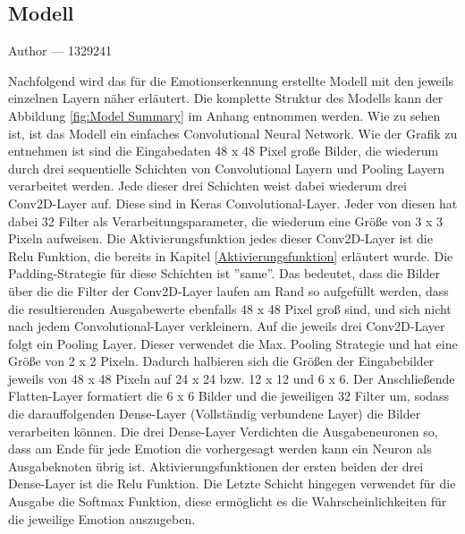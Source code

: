 \documentclass[12pt, a4paper]{report}
\makeatletter
\newcommand{\sectionauthor}[1]{%
  {\parindent0pt\vspace*{-5pt}%
  \large{Author --- }
  \linespread{1.1}\large\scshape#1%
  \par\nobreak\vspace*{35pt} }
  \@afterheading%
}
\makeatother
\begin{document}
\subsection{Modell}
\sectionauthor{1329241}
Nachfolgend wird das für die Emotionserkennung erstellte Modell mit den jeweils einzelnen Layern näher erläutert. Die komplette Struktur des Modells kann der Abbildung \ref{fig:Model Summary} im Anhang entnommen werden.
Wie zu sehen ist, ist das Modell ein einfaches Convolutional Neural Network. 
Wie der Grafik zu entnehmen ist sind die Eingabedaten 48 x 48 Pixel große Bilder, die wiederum durch drei sequentielle Schichten von Convolutional Layern und Pooling Layern verarbeitet werden. Jede dieser drei Schichten weist dabei wiederum drei Conv2D-Layer auf. Diese sind in Keras Convolutional-Layer. Jeder von diesen hat dabei 32 Filter als Verarbeitungsparameter, die wiederum eine Größe von 3 x 3 Pixeln aufweisen. Die Aktivierungsfunktion jedes dieser Conv2D-Layer ist die Relu Funktion, die bereits in Kapitel \ref{Aktivierungsfunktion} erläutert wurde. Die Padding-Strategie für diese Schichten ist ''same''. Das bedeutet, dass die Bilder über die die Filter der Conv2D-Layer laufen am Rand so aufgefüllt werden, dass die resultierenden Ausgabewerte ebenfalls 48 x 48 Pixel groß sind, und sich nicht nach jedem  Convolutional-Layer verkleinern. Auf die jeweils drei Conv2D-Layer folgt ein Pooling Layer. Dieser verwendet die Max. Pooling Strategie und hat eine Größe von 2 x 2 Pixeln. Dadurch halbieren sich die Größen der Eingabebilder jeweils von 48 x 48 Pixeln auf 24 x 24 bzw. 12 x 12 und 6 x 6. Der Anschließende Flatten-Layer formatiert die 6 x 6 Bilder und die jeweiligen 32 Filter um, sodass die darauffolgenden Dense-Layer (Vollständig verbundene Layer) die Bilder verarbeiten können. Die drei Dense-Layer Verdichten die Ausgabeneuronen so, dass am Ende für jede Emotion die vorhergesagt werden kann ein Neuron als Ausgabeknoten übrig ist. Aktivierungsfunktionen der ersten beiden der drei Dense-Layer ist die Relu Funktion. Die Letzte Schicht hingegen verwendet für die Ausgabe die Softmax Funktion, diese ermöglicht es die Wahrscheinlichkeiten für die jeweilige Emotion auszugeben.
\end{document}
